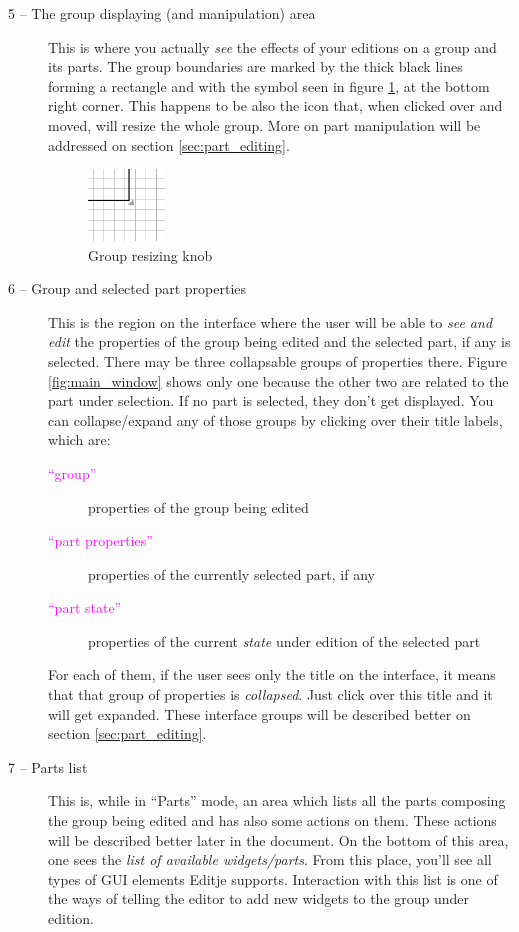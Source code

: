 \documentclass[a4paper]{profusion}
\newcommand{\GUILabel}[1]{\textcolor{magenta}{#1}}
\begin{document}
\begin{description}
\item[5 -- The group displaying (and manipulation) area] This is where
  you actually \emph{see} the effects of your editions on a group and
  its parts. The group boundaries are marked by the thick black lines
  forming a rectangle and with the symbol seen in figure
  \ref{fig:group_edje}, at the bottom right corner. This happens to be
  also the icon that, when clicked over and moved, will resize the
  whole group. More on part manipulation will be addressed on section
  \ref{sec:part_editing}.

\begin{figure}[h!]
  \centering
  \includegraphics[width=0.2\textwidth]{images/group_edje.png}
  \caption{Group resizing knob}
  \label{fig:group_edje}
\end{figure}

\item[6 -- Group and selected part properties] This is the region on
  the interface where the user will be able to \emph{see and edit} the
  properties of the group being edited and the selected part, if any
  is selected. There may be three collapsable groups of properties
  there. Figure \ref{fig:main_window} shows only one because the other
  two are related to the part under selection. If no part is selected,
  they don't get displayed. You can collapse/expand any of those
  groups by clicking over their title labels, which are:

  \begin{description}
    \item[\GUILabel{``group''}] properties of the group being edited
    \item[\GUILabel{``part properties''}] properties of the currently
      selected part, if any
    \item[\GUILabel{``part state''}] properties of the current
      \emph{state} under edition of the selected part
  \end{description}

For each of them, if the user sees only the title on the interface, it
means that that group of properties is \emph{collapsed}. Just click
over this title and it will get expanded. These interface groups will
be described better on section \ref{sec:part_editing}.

\item[7 -- Parts list] This is, while in ``Parts'' mode, an area which
  lists all the parts composing the group being edited and has also
  some actions on them. These actions will be described better later
  in the document. On the bottom of this area, one sees the \emph{list
    of available widgets/parts}. From this place, you'll see all types
  of GUI elements Editje supports. Interaction with this list is one
  of the ways of telling the editor to add new widgets to the group
  under edition.

\end{description}
\end{document}
